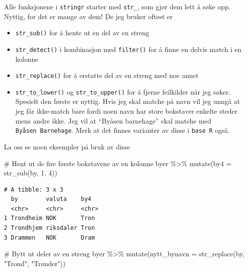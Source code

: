 \documentclass[
  letterpaper,
  DIV=11,
  numbers=noendperiod]{scrreprt}
\newenvironment{Shaded}{\begin{snugshade}}{\end{snugshade}}
\newcommand{\AttributeTok}[1]{\textcolor[rgb]{0.40,0.45,0.13}{#1}}
\newcommand{\CommentTok}[1]{\textcolor[rgb]{0.37,0.37,0.37}{#1}}
\newcommand{\DecValTok}[1]{\textcolor[rgb]{0.68,0.00,0.00}{#1}}
\newcommand{\FunctionTok}[1]{\textcolor[rgb]{0.28,0.35,0.67}{#1}}
\newcommand{\NormalTok}[1]{\textcolor[rgb]{0.00,0.23,0.31}{#1}}
\newcommand{\SpecialCharTok}[1]{\textcolor[rgb]{0.37,0.37,0.37}{#1}}
\newcommand{\StringTok}[1]{\textcolor[rgb]{0.13,0.47,0.30}{#1}}
\providecommand{\tightlist}{%
  \setlength{\itemsep}{0pt}\setlength{\parskip}{0pt}}\usepackage{longtable,booktabs,array}
\begin{document}
Alle funksjonene i \texttt{stringr} starter med \texttt{str\_}, som gjør
dem lett å søke opp. Nyttig, for det er mange av dem! De jeg bruker
oftest er

\begin{itemize}
\tightlist
\item
  \texttt{str\_sub()} for å hente ut en del av en streng
\item
  \texttt{str\_detect()} i kombinasjon med \texttt{filter()} for å finne
  en delvis match i en kolonne
\item
  \texttt{str\_replace()} for å erstatte del av en streng med noe annet
\item
  \texttt{str\_to\_lower()} og \texttt{str\_to\_upper()} for å fjerne
  feilkilder når jeg søker. Spesielt den første er nyttig. Hvis jeg skal
  matche på navn vil jeg unngå at jeg får ikke-match bare fordi noen
  navn har store bokstaver enkelte steder mens andre ikke. Jeg vil at
  ``Byåsen barnehage'' skal matche med \texttt{Byåsen\ Barnehage}. Merk
  at det finnes varianter av disse i \texttt{base\ R} også.
\end{itemize}

La oss se noen eksempler på bruk av disse

\begin{Shaded}
\begin{Highlighting}[]
\CommentTok{\# Hent ut de fire første bokstavene av en kolonne}
\NormalTok{byer }\SpecialCharTok{\%\textgreater{}\%} 
  \FunctionTok{mutate}\NormalTok{(}\AttributeTok{by4 =} \FunctionTok{str\_sub}\NormalTok{(by, }\DecValTok{1}\NormalTok{, }\DecValTok{4}\NormalTok{))}
\end{Highlighting}
\end{Shaded}

\begin{verbatim}
# A tibble: 3 x 3
  by        valuta    by4  
  <chr>     <chr>     <chr>
1 Trondheim NOK       Tron 
2 Trondhjem riksdaler Tron 
3 Drammen   NOK       Dram 
\end{verbatim}

\begin{Shaded}
\begin{Highlighting}[]
\CommentTok{\# Bytt ut deler av en streng}
\NormalTok{byer }\SpecialCharTok{\%\textgreater{}\%} 
  \FunctionTok{mutate}\NormalTok{(}\AttributeTok{nytt\_bynavn =} \FunctionTok{str\_replace}\NormalTok{(by, }\StringTok{"Trond"}\NormalTok{, }\StringTok{"Trønder"}\NormalTok{))}
\end{Highlighting}
\end{Shaded}
\end{document}
